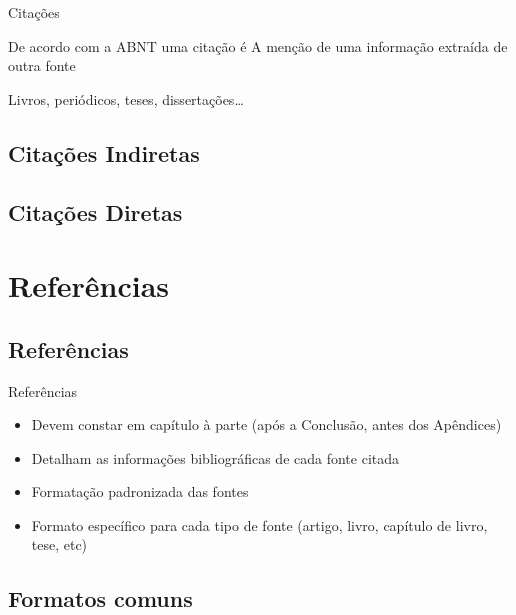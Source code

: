 \documentclass{beamer}
\begin{document}
\begin{frame}{Citações}
  \begin{block}{De acordo com a ABNT uma citação é}
    A menção de uma informação extraída de outra fonte
  \end{block}
  \begin{example}
    Livros, periódicos, teses, dissertações\ldots
  \end{example}
\end{frame}

\subsection{Citações Indiretas}

\subsection{Citações Diretas}

\section{Referências}

\subsection{Referências}

\begin{frame}{Referências}
  \begin{itemize}
  \item Devem constar em capítulo à parte (após a Conclusão, antes dos
    Apêndices)
  \item Detalham as informações bibliográficas de cada fonte citada
  \item Formatação padronizada das fontes
  \item Formato específico para cada tipo de fonte (artigo, livro,
    capítulo de livro, tese, etc)
  \end{itemize}
\end{frame}
\subsection{Formatos comuns}
\end{document}
